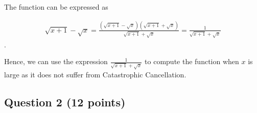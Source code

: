 \documentclass[11pt,onecolumn]{article}
\begin{document}
\begin{enumerate}[label=(\alph*)]
          The function can be expressed as

          \begin{align*}
              \sqrt{x+1}-\sqrt{x} = \frac{(\sqrt{x+1}-\sqrt{x})(\sqrt{x+1}+\sqrt{x})}{\sqrt{x+1}+\sqrt{x}} = \frac{1}{\sqrt{x+1}+\sqrt{x}}
          \end{align*}.

          Hence, we can use the expression $\frac{1}{\sqrt{x+1}+\sqrt{x}}$ to compute the function when $x$ is large as it does not suffer from Catastrophic Cancellation.

\end{enumerate}

\subsection*{Question 2 (12 points)}
\end{document}
